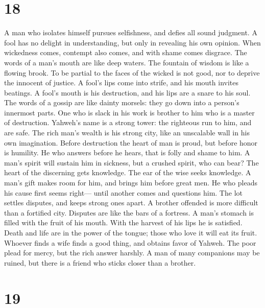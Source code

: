\hypertarget{section-17}{%
\section{18}\label{section-17}}

 A man who isolates himself pursues selfishness, and
defies all sound judgment.  A fool has no delight in
understanding, but only in revealing his own opinion. 
When wickedness comes, contempt also comes, and with shame comes
disgrace.  The words of a man's mouth are like deep
waters. The fountain of wisdom is like a flowing brook. 
To be partial to the faces of the wicked is not good, nor to deprive the
innocent of justice.  A fool's lips come into strife, and
his mouth invites beatings.  A fool's mouth is his
destruction, and his lips are a snare to his soul.  The
words of a gossip are like dainty morsels: they go down into a person's
innermost parts.  One who is slack in his work is brother
to him who is a master of destruction.  Yahweh's name is
a strong tower: the righteous run to him, and are safe. 
The rich man's wealth is his strong city, like an unscalable wall in his
own imagination.  Before destruction the heart of man is
proud, but before honor is humility.  He who answers
before he hears, that is folly and shame to him.  A man's
spirit will sustain him in sickness, but a crushed spirit, who can bear?
 The heart of the discerning gets knowledge. The ear of
the wise seeks knowledge.  A man's gift makes room for
him, and brings him before great men.  He who pleads his
cause first seems right--- until another comes and questions him.
 The lot settles disputes, and keeps strong ones apart.
 A brother offended is more difficult than a fortified
city. Disputes are like the bars of a fortress.  A man's
stomach is filled with the fruit of his mouth. With the harvest of his
lips he is satisfied.  Death and life are in the power of
the tongue; those who love it will eat its fruit. 
Whoever finds a wife finds a good thing, and obtains favor of Yahweh.
 The poor plead for mercy, but the rich answer harshly.
 A man of many companions may be ruined, but there is a
friend who sticks closer than a brother.

\hypertarget{section-18}{%
\section{19}\label{section-18}}

